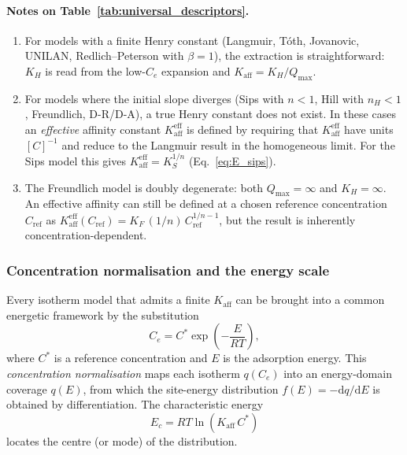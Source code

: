 \documentclass[12pt]{article}
\begin{document}
	\paragraph{Notes on Table~\ref{tab:universal_descriptors}.}

	\begin{enumerate}
		\item For models with a finite Henry constant (Langmuir, T\'oth,
		Jovanovic, UNILAN, Redlich--Peterson with $\beta = 1$), the
		extraction is straightforward: $K_H$ is read from the low-$C_e$
		expansion and $K_{\mathrm{aff}} = K_H / Q_{\max}$.

		\item For models where the initial slope diverges (Sips with
		$n < 1$, Hill with $n_H < 1$, Freundlich, D-R/D-A), a true
		Henry constant does not exist.  In these cases an
		\emph{effective} affinity constant
		$K_{\mathrm{aff}}^{\mathrm{eff}}$ is defined by requiring
		that $K_{\mathrm{aff}}^{\mathrm{eff}}$ have units $[C]^{-1}$
		and reduce to the Langmuir result in the homogeneous limit.
		For the Sips model this gives
		$K_{\mathrm{aff}}^{\mathrm{eff}} = K_S^{1/n}$
		(Eq.~\eqref{eq:E_sips}).

		\item The Freundlich model is doubly degenerate: both
		$Q_{\max} = \infty$ and $K_H = \infty$.  An effective
		affinity can still be defined at a chosen reference
		concentration $C_{\mathrm{ref}}$ as
		$K_{\mathrm{aff}}^{\mathrm{eff}}(C_{\mathrm{ref}})
		= K_F\,(1/n)\,C_{\mathrm{ref}}^{1/n - 1}$,
		but the result is inherently concentration-dependent.
	\end{enumerate}

	\subsubsection{Concentration normalisation and the energy scale}

	Every isotherm model that admits a finite $K_{\mathrm{aff}}$ can be
	brought into a common energetic framework by the substitution
	\begin{equation}
		C_e = C^{\ast}\exp\!\left(-\frac{E}{RT}\right),
		\label{eq:conc_norm_general}
	\end{equation}
	where $C^{\ast}$ is a reference concentration and $E$ is the
	adsorption energy.  This \emph{concentration normalisation} maps
	each isotherm $q(C_e)$ into an energy-domain coverage $q(E)$,
	from which the site-energy distribution
	$f(E) = -\mathrm{d}q/\mathrm{d}E$ is obtained by
	differentiation.  The characteristic energy
	\begin{equation}
		E_c = RT\ln(K_{\mathrm{aff}}\,C^{\ast})
	\end{equation}
	locates the centre (or mode) of the distribution.
\end{document}
